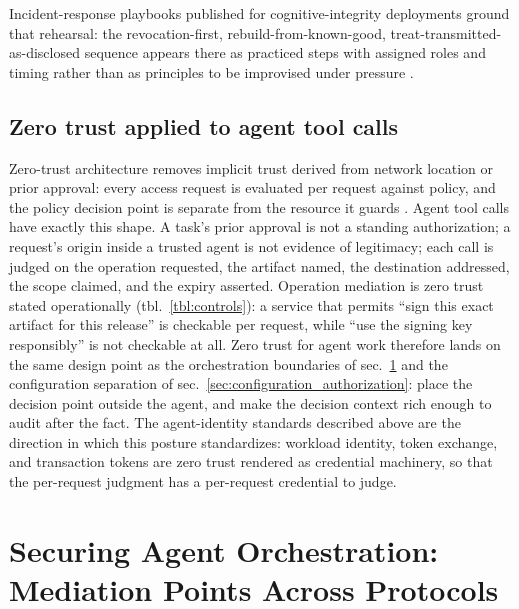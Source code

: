 \documentclass[
  english,
  9pt,
]{extarticle}
\begin{document}
Incident-response playbooks published for cognitive-integrity
deployments ground that rehearsal: the revocation-first,
rebuild-from-known-good, treat-transmitted-as-disclosed sequence appears
there as practiced steps with assigned roles and timing rather than as
principles to be improvised under pressure
\citep{cif_practitioner_2026}.

\subsection{Zero trust applied to agent tool
calls}\label{zero-trust-applied-to-agent-tool-calls}

Zero-trust architecture removes implicit trust derived from network
location or prior approval: every access request is evaluated per
request against policy, and the policy decision point is separate from
the resource it guards \citep{nist_sp800_207}. Agent tool calls have
exactly this shape. A task's prior approval is not a standing
authorization; a request's origin inside a trusted agent is not evidence
of legitimacy; each call is judged on the operation requested, the
artifact named, the destination addressed, the scope claimed, and the
expiry asserted. Operation mediation is zero trust stated operationally
(tbl.~\ref{tbl:controls}): a service that permits ``sign this exact
artifact for this release'' is checkable per request, while ``use the
signing key responsibly'' is not checkable at all. Zero trust for agent
work therefore lands on the same design point as the orchestration
boundaries of sec.~\ref{sec:orchestration} and the configuration
separation of sec.~\ref{sec:configuration_authorization}: place the
decision point outside the agent, and make the decision context rich
enough to audit after the fact. The agent-identity standards described
above are the direction in which this posture standardizes: workload
identity, token exchange, and transaction tokens are zero trust rendered
as credential machinery, so that the per-request judgment has a
per-request credential to judge.

\newpage

\section{Securing Agent Orchestration: Mediation Points Across
Protocols}\label{sec:orchestration}
\end{document}
